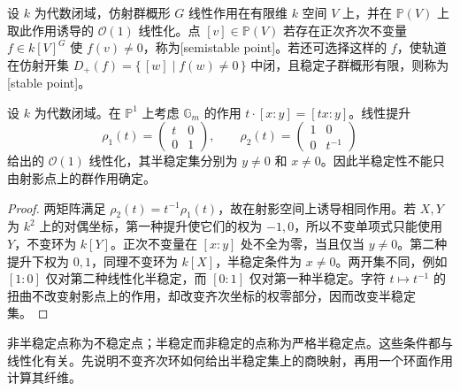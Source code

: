 \begin{definition}\label{b5:def:projective-semistability}
	设 \(k\) 为代数闭域，仿射群概形 \(G\) 线性作用在有限维 \(k\) 空间 \(V\) 上，并在 \(\mathbb P(V)\) 上取此作用诱导的 \(\mathcal O(1)\) 线性化。点 \([v]\in\mathbb P(V)\) 若存在正次齐次不变量 \(f\in k[V]^G\) 使 \(f(v)\ne0\)，称为[semistable point]。若还可选择这样的 \(f\)，使轨道在仿射开集 \(D_+(f)=\bigl\{\,[w]\mid f(w)\ne0\,\bigr\}\) 中闭，且稳定子群概形有限，则称为[stable point]。
\end{definition}

\begin{proposition}\label{b5:prop:projective-linearization-twist}
	设 \(k\) 为代数闭域。在 \(\mathbb P^1\) 上考虑 \(\mathbb G_m\) 的作用 \(t\cdot[x:y]=[tx:y]\)。线性提升
	\[
		\rho_1(t)=\begin{pmatrix}t&0\\0&1\end{pmatrix},\qquad
		\rho_2(t)=\begin{pmatrix}1&0\\0&t^{-1}\end{pmatrix}
	\]
	给出的 \(\mathcal O(1)\) 线性化，其半稳定集分别为 \(y\ne0\) 和 \(x\ne0\)。因此半稳定性不能只由射影点上的群作用确定。
\end{proposition}
\begin{proof}
	两矩阵满足 \(\rho_2(t)=t^{-1}\rho_1(t)\)，故在射影空间上诱导相同作用。若 \(X,Y\) 为 \(k^2\) 上的对偶坐标，第一种提升使它们的权为 \(-1,0\)，所以不变单项式只能使用 \(Y\)，不变环为 \(k[Y]\)。正次不变量在 \([x:y]\) 处不全为零，当且仅当 \(y\ne0\)。第二种提升下权为 \(0,1\)，同理不变环为 \(k[X]\)，半稳定条件为 \(x\ne0\)。两开集不同，例如 \([1:0]\) 仅对第二种线性化半稳定，而 \([0:1]\) 仅对第一种半稳定。字符 \(t\mapsto t^{-1}\) 的扭曲不改变射影点上的作用，却改变齐次坐标的权零部分，因而改变半稳定集。
\end{proof}

非半稳定点称为不稳定点；半稳定而非稳定的点称为严格半稳定点。这些条件都与线性化有关。先说明不变齐次环如何给出半稳定集上的商映射，再用一个环面作用计算其纤维。

